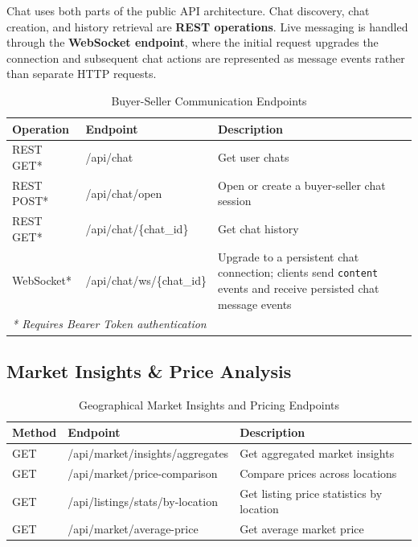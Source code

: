 Chat uses both parts of the public API architecture. Chat discovery, chat creation, and history retrieval are \textbf{REST operations}. Live messaging is handled through the \textbf{WebSocket endpoint}, where the initial request upgrades the connection and subsequent chat actions are represented as message events rather than separate HTTP requests.

\begin{table}[htpb]
\centering
\footnotesize
\begin{tabular}{p{2.4cm} p{6.6cm} p{5.2cm}}
\toprule
\textbf{Operation} & \textbf{Endpoint} & \textbf{Description} \\
\midrule
REST GET* & /api/chat & Get user chats \\
REST POST* & /api/chat/open & Open or create a buyer-seller chat session \\
REST GET* & /api/chat/\{chat\_id\} & Get chat history \\
WebSocket* & /api/chat/ws/\{chat\_id\} & Upgrade to a persistent chat connection; clients send \texttt{content} events and receive persisted chat message events \\
\bottomrule
\multicolumn{3}{l}{\small \textit{* Requires Bearer Token authentication}}
\end{tabular}
\caption{Buyer-Seller Communication Endpoints}
\label{tab:api_chat}
\end{table}

\subsection{Market Insights \& Price Analysis}
\begin{table}[htpb]
\centering
\begin{tabular}{p{1.8cm} p{6.5cm} p{6.5cm}}
\toprule
\textbf{Method} & \textbf{Endpoint} & \textbf{Description} \\
\midrule
GET & /api/market/insights/aggregates & Get aggregated market insights \\
GET & /api/market/price-comparison & Compare prices across locations \\
GET & /api/listings/stats/by-location & Get listing price statistics by location \\
GET & /api/market/average-price & Get average market price \\
\bottomrule
\end{tabular}
\caption{Geographical Market Insights and Pricing Endpoints}
\label{tab:api_market}
\end{table}

